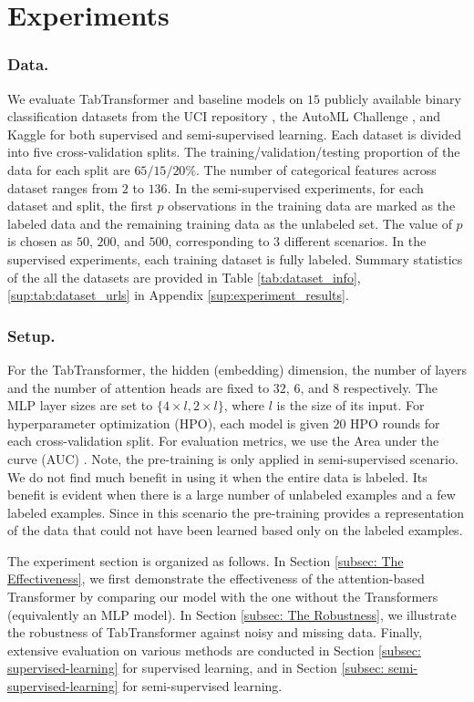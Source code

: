 \section{Experiments} \label{sec:experiments}

\subsubsection{Data.} We evaluate TabTransformer and baseline models on $15$ publicly available binary classification datasets from the UCI repository \citep{UCI}, the AutoML Challenge \citep{automlchallenges}, and Kaggle \citep{kaggle_inc_state_2017} for both supervised and semi-supervised learning. Each dataset is divided into five cross-validation splits. The  training/validation/testing proportion of the data for each split are $65/15/20\%$. The number of categorical features across dataset ranges from $2$ to $136$. In the semi-supervised experiments, for each dataset and split, the first $p$  observations in the training data are marked as the labeled data and the remaining training data as the unlabeled set. The value of $p$ is chosen as $50$, $200$, and $500$, corresponding to $3$ different scenarios.
In the supervised experiments, each training dataset is fully labeled. Summary statistics of the all the datasets are provided in Table \ref{tab:dataset_info}, \ref{sup:tab:dataset_urls} in Appendix \ref{sup:experiment_results}.

\subsubsection{Setup.} For the TabTransformer, the hidden (embedding) dimension, the number of layers and the number of attention heads are fixed to $32$, $6$, and $8$ respectively.  The MLP layer sizes are set to $\{4\times l, 2\times l\}$, where $l$ is the size of its input.
For hyperparameter optimization (HPO), each model is given $20$ HPO rounds for each cross-validation split.
For evaluation metrics, we use the Area under the curve (AUC) \citep{bradley1997use}.
Note, the pre-training is only applied in semi-supervised scenario. We do not find much benefit in using it when the entire data is labeled. Its benefit is evident when there is a large number of unlabeled examples and a few labeled examples. Since in this scenario the pre-training provides a representation of the data that could not have been learned based only on the labeled examples.

The experiment section is organized as follows. In Section \ref{subsec: The Effectiveness}, we first demonstrate the effectiveness of the attention-based Transformer by comparing our model with the one without the Transformers (equivalently an MLP model). In Section \ref{subsec: The Robustness}, we illustrate the robustness of TabTransformer against noisy and missing data. Finally, extensive evaluation on various methods are conducted in Section \ref{subsec: supervised-learning} for supervised learning, and in Section \ref{subsec: semi-supervised-learning} for semi-supervised learning.

